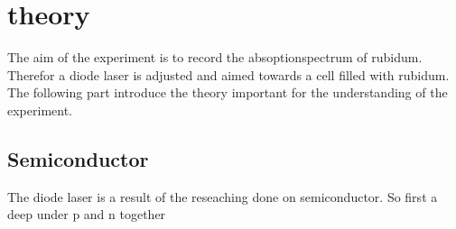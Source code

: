 \section{theory}
\label{sec:theory}
The aim of the experiment is to record the absoptionspectrum
of rubidum. Therefor a diode laser is adjusted and aimed towards a cell
filled with rubidum.
The following part introduce the theory
important for the understanding of the experiment.

\subsection{Semiconductor}
\label{subsec:Semiconductor}

The diode laser is a result of the reseaching done on semiconductor.
So first a deep under
p and n together




\
